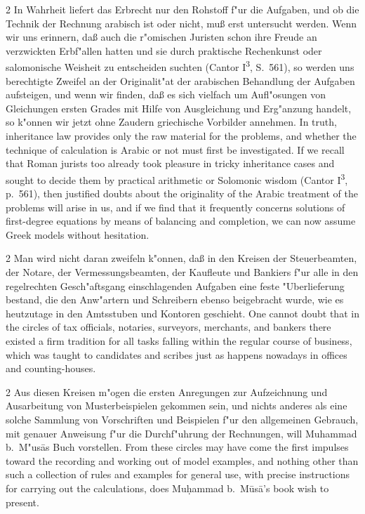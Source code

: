 \documentclass[10pt,a4paper]{article}
\renewcommand{\switchcolumn}{\syncronize\nointerlineskip\columnbreak}
\begin{document}
\begin{paracol}{2}
In Wahrheit liefert das Erbrecht nur den Rohstoff f"ur die Aufgaben, und ob die Technik der Rechnung arabisch ist oder nicht, mu\ss{} erst untersucht werden. Wenn wir uns erinnern, da\ss{} auch die r"omischen Juristen schon ihre Freude an verzwickten Erbf"allen hatten und sie durch praktische Rechenkunst oder salomonische Weisheit zu entscheiden suchten (Cantor I\textsuperscript{3}, S.\ 561), so werden uns berechtigte Zweifel an der Originalit"at der arabischen Behandlung der Aufgaben aufsteigen, und wenn wir finden, da\ss{} es sich vielfach um Aufl"osungen von Gleichungen ersten Grades mit Hilfe von Ausgleichung und Erg"anzung handelt, so k"onnen wir jetzt ohne Zaudern griechische Vorbilder annehmen.
\switchcolumn
In truth, inheritance law provides only the raw material for the problems, and whether the technique of calculation is Arabic or not must first be investigated. If we recall that Roman jurists too already took pleasure in tricky inheritance cases and sought to decide them by practical arithmetic or Solomonic wisdom (Cantor I\textsuperscript{3}, p.\ 561), then justified doubts about the originality of the Arabic treatment of the problems will arise in us, and if we find that it frequently concerns solutions of first-degree equations by means of balancing and completion, we can now assume Greek models without hesitation.
\end{paracol}

\begin{paracol}{2}
Man wird nicht daran zweifeln k"onnen, da\ss{} in den Kreisen der Steuerbeamten, der Notare, der Vermessungsbeamten, der Kaufleute und Bankiers f"ur alle in den regelrechten Gesch"aftsgang einschlagenden Aufgaben eine feste "Uberlieferung bestand, die den Anw"artern und Schreibern ebenso beigebracht wurde, wie es heutzutage in den Amtsstuben und Kontoren geschieht.
\switchcolumn
One cannot doubt that in the circles of tax officials, notaries, surveyors, merchants, and bankers there existed a firm tradition for all tasks falling within the regular course of business, which was taught to candidates and scribes just as happens nowadays in offices and counting-houses.
\end{paracol}

\begin{paracol}{2}
Aus diesen Kreisen m"ogen die ersten Anregungen zur Aufzeichnung und Ausarbeitung von Musterbeispielen gekommen sein, und nichts anderes als eine solche Sammlung von Vorschriften und Beispielen f"ur den allgemeinen Gebrauch, mit genauer Anweisung f"ur die Durchf"uhrung der Rechnungen, will Muhammad b.\ M"us\=as Buch vorstellen.
\switchcolumn
From these circles may have come the first impulses toward the recording and working out of model examples, and nothing other than such a collection of rules and examples for general use, with precise instructions for carrying out the calculations, does Mu\d{h}ammad b.\ M\=us\=a's book wish to present.
\end{paracol}
\end{document}
